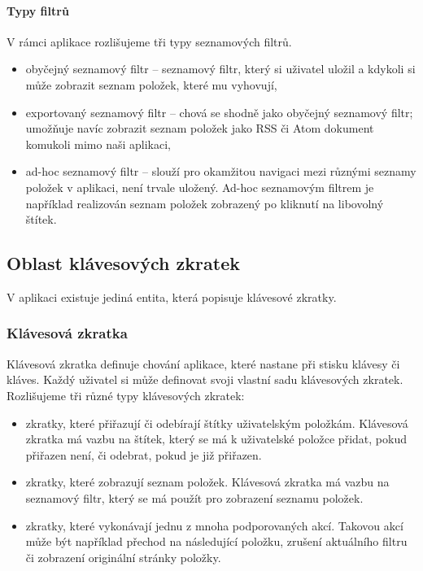 \paragraph{Typy filtrů}
V rámci aplikace rozlišujeme tři typy seznamových filtrů.
\begin{itemize}
	\item obyčejný seznamový filtr -- seznamový filtr, který si uživatel uložil a kdykoli si může zobrazit seznam položek, které mu vyhovují,
	\item exportovaný seznamový filtr -- chová se shodně jako obyčejný seznamový filtr; umožňuje navíc zobrazit seznam položek jako RSS či Atom dokument komukoli mimo naši aplikaci,
	\item ad-hoc seznamový filtr -- slouží pro okamžitou navigaci mezi různými seznamy položek v aplikaci, není trvale uložený.
		Ad-hoc seznamovým filtrem je například realizován seznam položek zobrazený po kliknutí na libovolný štítek.
\end{itemize}

\subsection{Oblast klávesových zkratek}

V aplikaci existuje jediná entita, která popisuje klávesové zkratky.

\subsubsection{Klávesová zkratka}

Klávesová zkratka definuje chování aplikace, které nastane při stisku klávesy či kláves.
Každý uživatel si může definovat svoji vlastní sadu klávesových zkratek.
Rozlišujeme tři různé typy klávesových zkratek:
\begin{itemize}
	\item zkratky, které přiřazují či odebírají štítky uživatelským položkám.
		Klávesová zkratka má vazbu na štítek, který se má k uživatelské položce přidat, pokud přiřazen není, či odebrat, pokud je již přiřazen.
	\item zkratky, které zobrazují seznam položek.
		Klávesová zkratka má vazbu na seznamový filtr, který se má použít pro zobrazení seznamu položek.
	\item zkratky, které vykonávají jednu z mnoha podporovaných akcí.
		Takovou akcí může být například přechod na následující položku, zrušení aktuálního filtru či zobrazení originální stránky položky.
\end{itemize}

